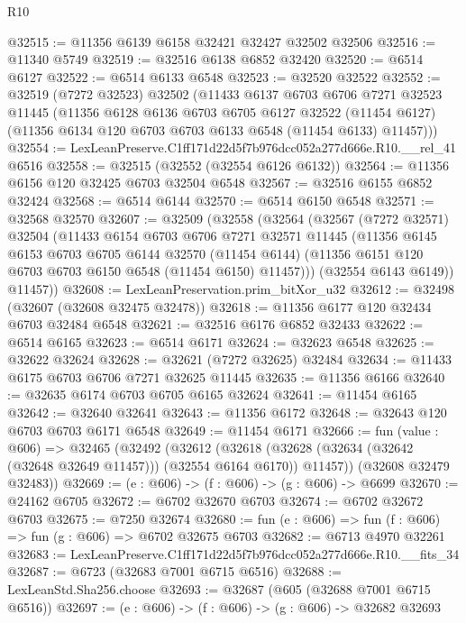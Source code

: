 \begin{lexlean}{R10}
\begin{coremodule}
@32515 := @11356 @6139 @6158 @32421 @32427 @32502 @32506
@32516 := @11340 @5749
@32519 := @32516 @6138 @6852 @32420
@32520 := @6514 @6127
@32522 := @6514 @6133 @6548
@32523 := @32520 @32522
@32552 := @32519
    (@7272 @32523)
    @32502
    (@11433
      @6137
      @6703
      @6706
      @7271
      @32523
      @11445
      (@11356
        @6128
        @6136
        @6703
        @6705
        @6127
        @32522
        (@11454 @6127)
        (@11356 @6134 @120 @6703 @6703 @6133 @6548 (@11454 @6133) @11457)))
@32554 := LexLeanPreserve.C1ff171d22d5f7b976dcc052a277d666e.R10.__rel_41 @6516
@32558 := @32515 (@32552 (@32554 @6126 @6132))
@32564 := @11356 @6156 @120 @32425 @6703 @32504 @6548
@32567 := @32516 @6155 @6852 @32424
@32568 := @6514 @6144
@32570 := @6514 @6150 @6548
@32571 := @32568 @32570
@32607 := @32509
    (@32558
      (@32564
        (@32567
          (@7272 @32571)
          @32504
          (@11433
            @6154
            @6703
            @6706
            @7271
            @32571
            @11445
            (@11356
              @6145
              @6153
              @6703
              @6705
              @6144
              @32570
              (@11454 @6144)
              (@11356 @6151 @120 @6703 @6703 @6150 @6548 (@11454 @6150) @11457)))
          (@32554 @6143 @6149))
        @11457))
@32608 := LexLeanPreservation.prim_bitXor_u32
@32612 := @32498 (@32607 (@32608 @32475 @32478))
@32618 := @11356 @6177 @120 @32434 @6703 @32484 @6548
@32621 := @32516 @6176 @6852 @32433
@32622 := @6514 @6165
@32623 := @6514 @6171
@32624 := @32623 @6548
@32625 := @32622 @32624
@32628 := @32621 (@7272 @32625) @32484
@32634 := @11433 @6175 @6703 @6706 @7271 @32625 @11445
@32635 := @11356 @6166
@32640 := @32635 @6174 @6703 @6705 @6165 @32624
@32641 := @11454 @6165
@32642 := @32640 @32641
@32643 := @11356 @6172
@32648 := @32643 @120 @6703 @6703 @6171 @6548
@32649 := @11454 @6171
@32666 := fun (value : @606) =>
  @32465
    (@32492
      (@32612
        (@32618 (@32628 (@32634 (@32642 (@32648 @32649 @11457))) (@32554 @6164 @6170)) @11457))
      (@32608 @32479 @32483))
@32669 := (e : @606) -> (f : @606) -> (g : @606) -> @6699
@32670 := @24162 @6705
@32672 := @6702 @32670 @6703
@32674 := @6702 @32672 @6703
@32675 := @7250 @32674
@32680 := fun (e : @606) => fun (f : @606) => fun (g : @606) => @6702 @32675 @6703
@32682 := @6713 @4970 @32261
@32683 := LexLeanPreserve.C1ff171d22d5f7b976dcc052a277d666e.R10.__fits_34
@32687 := @6723 (@32683 @7001 @6715 @6516)
@32688 := LexLeanStd.Sha256.choose
@32693 := @32687 (@605 (@32688 @7001 @6715 @6516))
@32697 := (e : @606) -> (f : @606) -> (g : @606) -> @32682 @32693

\end{coremodule}
\end{lexlean}
